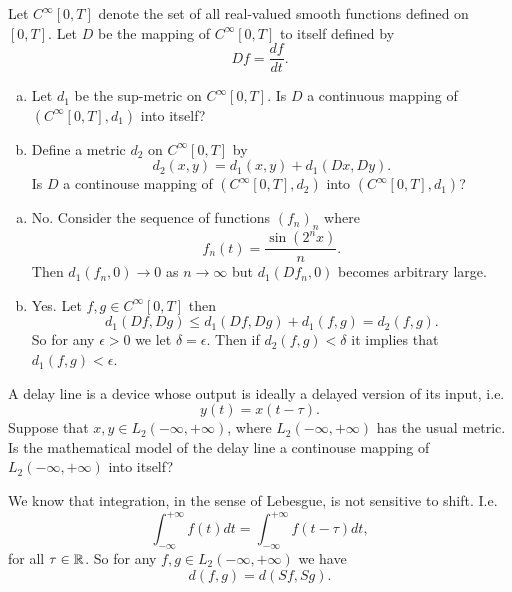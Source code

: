 \begin{problem}
	Let $ C^\infty[0,T] $ denote the set of all real-valued smooth functions defined on $ [0,T] $. Let $ D $ be the mapping of $ C^\infty[0,T] $ to itself defined by
	\[ Df = \frac{df}{dt}. \]
	\begin{enumerate}[(a)]
		\item Let $ d_1 $ be the sup-metric on $ C^\infty[0,T] $. Is $ D $ a continuous mapping  of $ (C^\infty[0,T],d_1) $ into itself?
		
		\item Define a metric $ d_2 $ on $ C^\infty[0,T] $ by
		\[ d_2(x,y) = d_1(x,y) + d_1(Dx,Dy). \]
		Is $ D $ a continouse mapping of $ (C^\infty[0,T], d_2) $ into $ (C^\infty[0,T], d_1) $?
	\end{enumerate}
\end{problem}
\begin{solution}
	\begin{enumerate}[(a)]
		\item No. Consider the sequence of functions $ (f_n)_n $ where 
		\[ f_n(t) = \frac{\sin(2^n x)}{n}. \]
		Then $ d_1(f_n, 0)\to 0 $ as $ n\to \infty $ but $ d_1(Df_n, 0) $ becomes arbitrary large. 
		
		\item Yes. Let $ f,g \in  C^\infty[0,T] $ then
		\[ d_1(Df, Dg) \leq d_1(Df, Dg) + d_1(f,g) = d_2(f,g). \]
		So for any $ \epsilon>0 $ we let $ \delta = \epsilon $. Then if $ d_2(f,g) < \delta $ it implies that $ d_1(f,g) < \epsilon $.
	\end{enumerate}
\end{solution}

\begin{problem}
	A delay line is a device whose output is ideally a delayed version of its input, i.e.
	\[ y(t) = x(t-\tau). \]
	Suppose that $ x,y \in L_2(-\infty,+\infty) $, where $ L_2(-\infty,+\infty) $ has the usual metric. Is the mathematical model of the delay line a continouse mapping of $ L_2(-\infty,+\infty) $ into itself?
\end{problem}

\begin{solution}
	We know that integration, in the sense of Lebesgue, is not sensitive to shift. I.e.
	\[ \int_{-\infty}^{+\infty} f(t) dt = \int_{-\infty}^{+\infty} f(t-\tau) dt, \]
	for all $ \tau \in \mathbb{R} $. So for any $ f,g \in L_2(-\infty,+\infty) $ we have
	\[ d(f,g) = d(Sf, Sg). \]
\end{solution}



